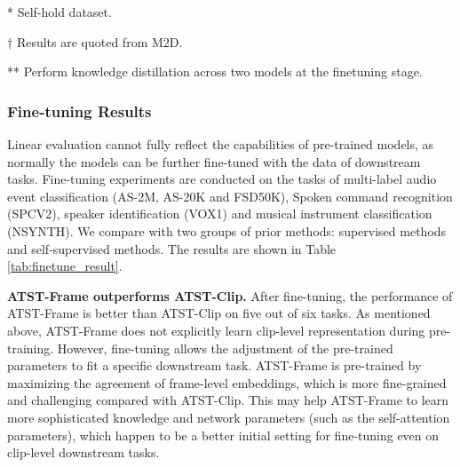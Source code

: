 \begin{table*}[ht]
{\begin{threeparttable}
\begin{tabular}{lcccccccc}
        \bottomrule
      \end{tabular}
      \begin{tablenotes}
\item{*} Self-hold dataset\cite{srivastava_conformer-based_2022}.
      \item{$\dagger$} Results are quoted from M2D\cite{niizumi_masked_2023}.
      \item{**} Perform knowledge distillation across two models at the finetuning stage.
      \end{tablenotes}


    \end{threeparttable}
  }
  \caption{ Finetuning results on clip-level downstream tasks. The scores of comparison models are quoted from their papers. AS and LS denote AudioSet and Librispeech\cite{panayotov2015librispeech}, respectively.  }
  \label{tab:finetune_result}
\end{table*}

\subsubsection{Fine-tuning Results}

Linear evaluation cannot fully reflect the capabilities of pre-trained models, as normally the models can be further fine-tuned with the data  of downstream tasks. Fine-tuning experiments are conducted on the tasks of multi-label audio event classification (AS-2M, AS-20K and FSD50K), Spoken command recognition (SPCV2), speaker identification (VOX1) and musical instrument classification (NSYNTH). We compare with two groups of prior methods: supervised methods and self-supervised methods. The results are shown in Table \ref{tab:finetune_result}. 

\textbf{ATST-Frame outperforms ATST-Clip.} After fine-tuning, the performance of ATST-Frame is better than ATST-Clip on five out of six tasks. As mentioned above, ATST-Frame does not explicitly learn clip-level representation during pre-training. However, fine-tuning allows the adjustment of the pre-trained parameters to fit a specific downstream task. 
ATST-Frame is pre-trained by maximizing the agreement of frame-level embeddings, which is more fine-grained and challenging compared with ATST-Clip. This may help ATST-Frame to learn more sophisticated knowledge and network parameters (such as the self-attention parameters), which happen to be a better initial setting for fine-tuning even on clip-level downstream tasks.

